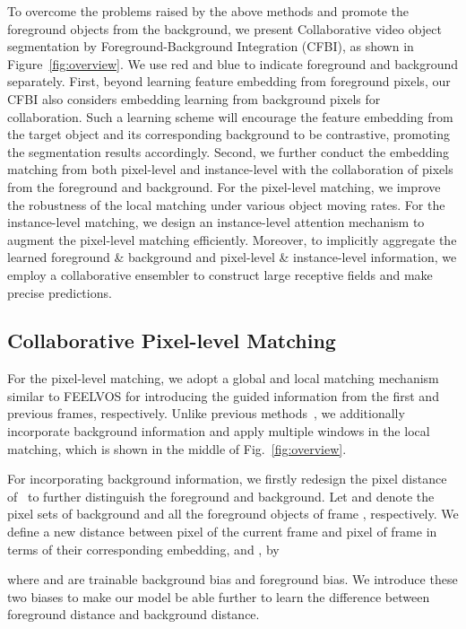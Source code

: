 \documentclass[runningheads]{llncs}
\begin{document}
To overcome the problems raised by the above methods and promote the foreground objects from the background, we present Collaborative video object segmentation by Foreground-Background Integration (CFBI), as shown in Figure~\ref{fig:overview}. We use red and blue to indicate foreground and background separately. First, beyond learning feature embedding from foreground pixels, our CFBI also considers embedding learning from background pixels for collaboration. Such a learning scheme will encourage the feature embedding from the target object and its corresponding background to be contrastive, promoting the segmentation results accordingly. Second, we further conduct the embedding matching from both pixel-level and instance-level with the collaboration of pixels from the foreground and background. For the pixel-level matching, 
we improve the robustness of the local matching under various object moving rates. For the instance-level matching, we design an instance-level attention mechanism to augment the pixel-level matching efficiently. Moreover, to implicitly aggregate the learned foreground \& background and pixel-level \& instance-level information, we employ a collaborative ensembler to construct large receptive fields and make precise predictions.



\subsection{Collaborative Pixel-level Matching}

For the pixel-level matching, we adopt a global and local matching mechanism similar to FEELVOS for introducing the guided information from the first and previous frames, respectively. Unlike previous methods~\cite{pml,feelvos}, we additionally incorporate background information and apply multiple windows in the local matching, which is shown in the middle of Fig.~\ref{fig:overview}. 

For incorporating background information, we firstly redesign the pixel distance of~\cite{feelvos} to further distinguish the foreground and background.
Let  and  denote the pixel sets of background and all the foreground objects of frame , respectively. We define a new distance between pixel  of the current frame  and pixel  of frame  in terms of their corresponding embedding,  and , by

where  and  are trainable background bias and foreground bias. We introduce these two biases to make our model be able further to learn the difference between foreground distance and background distance.
\end{document}
